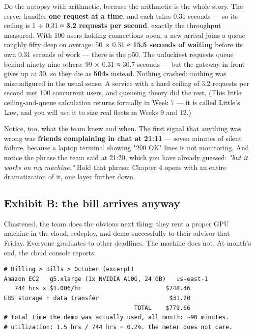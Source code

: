 Do the autopsy with arithmetic, because the arithmetic is the whole story. The server handles \textbf{one request at a time}, and each takes 0.31 seconds — so its ceiling is 1 ÷ 0.31 ≈ \textbf{3.2 requests per second}, exactly the throughput  measured. With 100 users holding connections open, a new arrival joins a queue roughly fifty deep on average: 50 × 0.31 ≈ \textbf{15.5 seconds of waiting} before its own 0.31 seconds of work — there is the p50. The unluckiest requests queue behind ninety-nine others: 99 × 0.31 ≈ 30.7 seconds — but the gateway in front gives up at 30, so they die as \textbf{504s} instead. Nothing crashed; nothing was misconfigured in the usual sense. A service with a hard ceiling of 3.2 requests per second met 100 concurrent users, and queueing theory did the rest. (This little ceiling-and-queue calculation returns formally in Week 7 — it is called Little's Law, and you will use it to size real fleets in Weeks 9 and 12.)

Notice, too, what the team knew and when. The first signal that anything was wrong was \textbf{friends complaining in chat at 21:11} — seven minutes of silent failure, because a laptop terminal showing "200 OK" lines is not monitoring. And notice the phrase the team said at 21:20, which you have already guessed: \textit{"but it works on my machine."} Hold that phrase; Chapter 4 opens with an entire dramatization of it, one layer further down.

\subsection*{Exhibit B: the bill arrives anyway}

Chastened, the team does the obvious next thing: they rent a proper GPU machine in the cloud, redeploy, and demo successfully to their advisor that Friday. Everyone graduates to other deadlines. The machine does not. At month's end, the cloud console reports:

\begin{terminalbox}
\begin{Verbatim}[breaklines=true,breakanywhere=true,fontsize=\small,formatcom=\color{tbbtermfg},codes=\tbbcodeactive]
# Billing > Bills > October (excerpt)
Amazon EC2   g5.xlarge (1x NVIDIA A10G, 24 GB)   us-east-1
   744 hrs x $1.006/hr                        $748.46
EBS storage + data transfer                    $31.20
                                     TOTAL    $779.66
# total time the demo was actually used, all month: ~90 minutes.
# utilization: 1.5 hrs / 744 hrs = 0.2%. the meter does not care.
\end{Verbatim}
\end{terminalbox}

